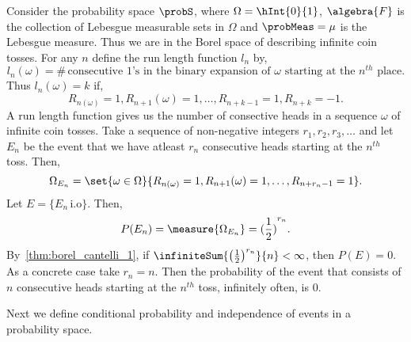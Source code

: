 \begin{Example}[name=Run lengths]
    Consider the probability space $\probS$, where $\Omega = \hInt{0}{1}$, $\algebra{F}$ is the
    collection of Lebesgue measurable sets in $\Omega$ and $\probMeas = \mu$ is the Lebesgue
    measure. Thus we are in the Borel space of describing infinite coin tosses. For any $n$ define
    the run length function $l_n$ by,
    \begin{equation*}
	l_n(\omega) = \# \,\text{consecutive $1$'s in the binary expansion of $\omega$ starting at
	    the $n^{th}$ place}.
    \end{equation*}
    Thus $l_n(\omega) = k$ if,\[R_{n(\omega)} = 1, R_{n+1}(\omega) = 1,\ldots,R_{n+k-1} = 1,R_{n+k} =
	-1.\]
    A run length function gives us the number of consective heads in a sequence $\omega$ of
    infinite coin tosses. Take a sequence of non-negative integers $r_1,r_2,r_3,\ldots$ and let
    $E_n$ be the event that we have atleast $r_n$ consecutive heads starting at the $n^{th}$ toss. 
    Then, 
    \[\Omega_{E_n} = \set{\omega\in\Omega}{R_{n(\omega)} = 1, R_{n+1}(\omega) = 1,\ldots,R_{n+r_n-1} 
	    = 1}.\]
    Let $E = \lbrace E_n\,\text{i.o} \rbrace$. Then,
    \[P(E_n) = \measure{\Omega_{E_n}} = {(\frac{1}{2})}^{r_n}.\]
    By~\ref{thm:borel_cantelli_1}, if $\infiniteSum{{\left(\frac{1}{2}\right)}^{r_n}}{n} < \infty$, then
    $P(E) = 0$. As a concrete case take $r_n = n$. Then the probability of the event that consists
    of $n$ consecutive heads starting at the $n^{th}$ toss, infinitely often, is $0$.
\end{Example}
Next we define conditional probability and independence of events in a probability space.
